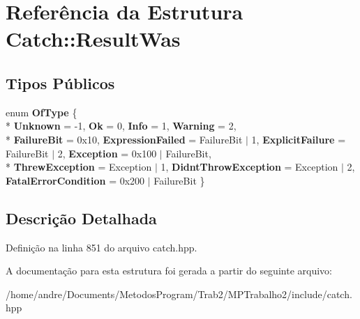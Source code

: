 \hypertarget{structCatch_1_1ResultWas}{}\section{Referência da Estrutura Catch\+:\+:Result\+Was}
\label{structCatch_1_1ResultWas}
\subsection*{Tipos Públicos}
\begin{DoxyCompactItemize}
\item 
enum {\bfseries Of\+Type} \{ \\*
{\bfseries Unknown} = -\/1, 
{\bfseries Ok} = 0, 
{\bfseries Info} = 1, 
{\bfseries Warning} = 2, 
\\*
{\bfseries Failure\+Bit} = 0x10, 
{\bfseries Expression\+Failed} = Failure\+Bit $\vert$ 1, 
{\bfseries Explicit\+Failure} = Failure\+Bit $\vert$ 2, 
{\bfseries Exception} = 0x100 $\vert$ Failure\+Bit, 
\\*
{\bfseries Threw\+Exception} = Exception $\vert$ 1, 
{\bfseries Didnt\+Throw\+Exception} = Exception $\vert$ 2, 
{\bfseries Fatal\+Error\+Condition} = 0x200 $\vert$ Failure\+Bit
 \}\hypertarget{structCatch_1_1ResultWas_a624e1ee3661fcf6094ceef1f654601ef}{}\label{structCatch_1_1ResultWas_a624e1ee3661fcf6094ceef1f654601ef}

\end{DoxyCompactItemize}


\subsection{Descrição Detalhada}


Definição na linha 851 do arquivo catch.\+hpp.



A documentação para esta estrutura foi gerada a partir do seguinte arquivo\+:\begin{DoxyCompactItemize}
\item 
/home/andre/\+Documents/\+Metodos\+Program/\+Trab2/\+M\+P\+Trabalho2/include/catch.\+hpp\end{DoxyCompactItemize}
